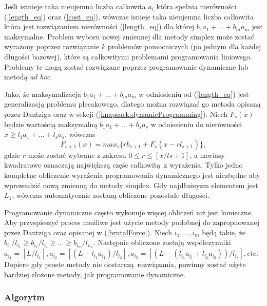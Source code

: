 Jeśli istnieje taka nieujemna liczba całkowita $a_i$ która spełnia nierówności (\cref{length_eq}) oraz (\cref{cost_eq}), wówczas isnieje taka nieujemna liczba całkowita która jest rozwiązaniem nierówności (\cref{length_eq}) dla której $b_1a_1+\dots+b_ma_m$ jest maksymalne. Problem wyboru nowej zmiennej dla metody simplex może zostać wyrażony poprzez rozwiązanie $k$ problemów pomocniczych (po jednym dla każdej długości bazowej), które są całkowitymi problemami programowania liniowego. Problemy te mogą zostać rozwiązane poprzez programowanie dynamiczne lub metodą \textit{ad hoc}.

Jako, że maksymalizacja $b_1a_1+\dots+b_ma_m$ w odniesieniu od (\cref{length_eq}) jest generalizacją problemu plecakowego, dlatego można rozwiązać go metoda opisaną przez Dantziga \cite{DantzigArticle} oraz w sekcji (\cref{knapsack:dynamicProgramming}). Niech $F_s(x)$ będzie wartością maksymalną $b_1a_1+\dots+b_sa_s$ w odniesieniu do nierówności $x \ge l_1a_1+\dots+l_sa_s$, wówczas
\begin{equation*}
  F_{s+1}(x) = max_r\{rb_{s+1}+F_s(x-rl_{s+1})\},
\end{equation*}
gdzie $r$ może zostać wybrane z zakresu $0 \le r \le [x/l{s+1}]$, a nawiasy kwadratowe oznaczają największą częśc całkowitą z wyrażenia. Tylko jedno kompletne obliczenie wyrażenia programowania dynamicznego jest niezbędne aby wprowadzić nową zmienną do metody simplex. Gdy najdłużsyzm elementem jest $L_1$, wówczas automatycznie zostaną obliczone pozostałe długości.

Programowanie dynamiczne często wykonuje więcej obliczeń niż jest konieczne. Aby przyspieszyć proces możliwe jest użycie metody podobnej do zapropnowanej przez Dantziga \cite{DantzigArticle} oraz opisanej w (\cref{brutalForce}). Niech $i_1,\dots,i_m$ będą takie, że $b_i_1/l_i_1 \ge b_i_1/l_i_2 \ge \dots \ge b_i_m/l_i_m$. Następnie obliczone zostają współczynniki $a_i_1=[L/l_i_1], a_i_2=[(L-l_i_1a_i_1)/l_i_2], a_i_3 = [(L - (l_i_1a_i_1 + l_i_2a_i_2))/l_i_3], etc$. Dopiero gdy proste metody nie dostarczą rozwiązania, powinny zostać użyte bardziej złożone metody, jak programowanie dynamiczne.

\subsubsection{Algorytm}

